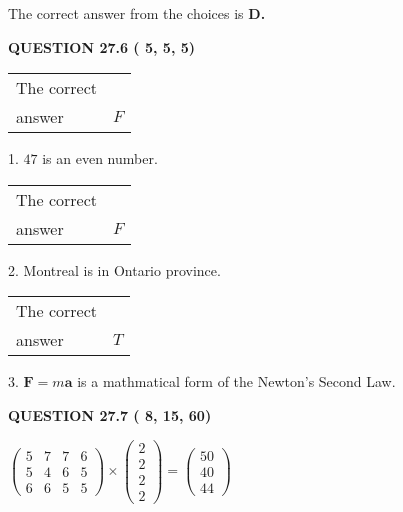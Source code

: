 \documentclass[12pt]{article}
\begin{document}
 

The correct answer from the choices is
{\textbf{\large{
D.}}}
 
  
  
{\textbf{\large{QUESTION
27.6 
 (          5,          5,          5)
}}}

 
\noindent\begin{tabular}{|l|l|}\hline The correct & \\
          answer &  %
$F$ \\ \hline \end{tabular}
1. $ %
47$ is an  %
even number.
 
\noindent\begin{tabular}{|l|l|}\hline The correct & \\
          answer &  %
$F$ \\ \hline \end{tabular}
2.  %
Montreal is in  %
Ontario province.
 
\noindent\begin{tabular}{|l|l|}\hline The correct & \\
          answer &  %
$T$ \\ \hline \end{tabular}
3.  %
$\mathbf{F}=m\mathbf{a}$ is a mathmatical form of  %
the Newton's Second Law.
 
  
  
{\textbf{\large{QUESTION
27.7 
 (          8,         15,         60)
}}}

 
$\left( \begin{array}{ccccccccccccccc}
           5 & 
           7 & 
           7 & 
           6 \\ 
           5 & 
           4 & 
           6 & 
           5 \\ 
           6 & 
           6 & 
           5 & 
           5
\end{array}\right) \times
\left( \begin{array}{c}
           2 \\ 
           2 \\ 
           2 \\ 
           2
\end{array}\right)  =
\left( \begin{array}{c}
          50 \\ 
          40 \\ 
          44
\end{array}\right)  $
 
\end{document}
